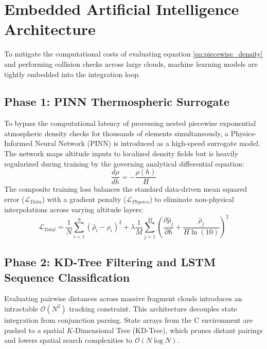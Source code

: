 \documentclass[letterpaper,11pt]{AAS}
\begin{document}
\section{Embedded Artificial Intelligence Architecture}
\label{sec:ai_architecture}

To mitigate the computational costs of evaluating equation \eqref{eq:piecewise_density} and performing collision checks across large clouds, machine learning models are tightly embedded into the integration loop.

\subsection{Phase 1: PINN Thermospheric Surrogate}
To bypass the computational latency of processing nested piecewise exponential atmospheric density checks for thousands of elements simultaneously, a Physics-Informed Neural Network (PINN) is introduced as a high-speed surrogate model. The network maps altitude inputs to localized density fields but is heavily regularized during training by the governing analytical differential equation:
\begin{equation}
    \frac{d\rho}{dh} = -\frac{\rho(h)}{H}
\end{equation}
The composite training loss balances the standard data-driven mean squared error ($\mathcal{L}_{Data}$) with a gradient penalty ($\mathcal{L}_{Physics}$) to eliminate non-physical interpolations across varying altitude layers:
\begin{equation}
    \mathcal{L}_{Total} = \frac{1}{N} \sum_{i=1}^{N} (\hat{\rho}_i - \rho_i)^2 + \lambda \frac{1}{M} \sum_{j=1}^{M} \left( \frac{\partial \hat{\rho}_j}{\partial h} + \frac{\hat{\rho}_j}{H \ln(10)} \right)^2
    \label{eq:pinn_composite_loss}
\end{equation}

\subsection{Phase 2: KD-Tree Filtering and LSTM Sequence Classification}
Evaluating pairwise distances across massive fragment clouds introduces an intractable $\mathcal{O}(N^2)$ tracking constraint. This architecture decouples state integration from conjunction parsing. State arrays from the C environment are pushed to a spatial $K$-Dimensional Tree (KD-Tree), which prunes distant pairings and lowers spatial search complexities to $\mathcal{O}(N \log N)$. 
\end{document}
